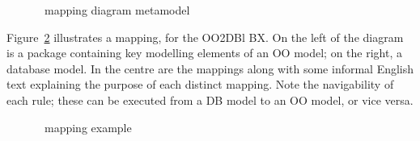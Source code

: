 \begin{figure}[htbp]
\caption{\transml\ mapping diagram metamodel \cite{GuerraLKPS13}}
\label{fig:transml-mapping-diagram}
\end{figure}

Figure~\ref{fig:transml-mapping-example1} illustrates a mapping, for the OO2DBl BX. On the left of the diagram is a package containing key modelling elements of an OO model; on the right, a database model. In the centre are the mappings along with some informal English text explaining the purpose of each distinct mapping. Note the navigability of each rule; these can be executed from a DB model to an OO model, or vice versa.

\begin{figure}[htbp]
\caption{\transml\ mapping example \cite{GuerraLKPS13}}
\label{fig:transml-mapping-example1}
\end{figure}

